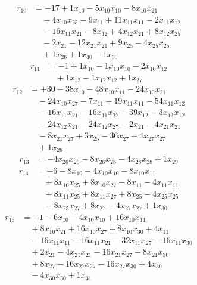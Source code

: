 \[\begin{aligned}
r_{10} &= - 17 + 1 x_{10} - 5 x_{10} x_{10} - 8 x_{10} x_{21} \\
 &\quad - 4 x_{10} x_{25} - 9 x_{11} + 11 x_{11} x_{11} - 2 x_{11} x_{12} \\
 &\quad - 16 x_{11} x_{21} - 8 x_{12} + 4 x_{12} x_{21} + 8 x_{12} x_{25} \\
 &\quad - 2 x_{21} - 12 x_{21} x_{21} + 9 x_{25} - 4 x_{25} x_{25} \\
 &\quad + 1 x_{26} + 1 x_{40} - 1 x_{65}
\end{aligned}\]
\[\begin{aligned}
r_{11} &= - 1 + 1 x_{10} - 1 x_{10} x_{10} - 2 x_{10} x_{12} \\
 &\quad + 1 x_{12} - 1 x_{12} x_{12} + 1 x_{27}
\end{aligned}\]
\[\begin{aligned}
r_{12} &= + 30 - 38 x_{10} - 48 x_{10} x_{11} - 24 x_{10} x_{21} \\
 &\quad - 24 x_{10} x_{27} - 7 x_{11} - 19 x_{11} x_{11} - 54 x_{11} x_{12} \\
 &\quad - 16 x_{11} x_{21} - 16 x_{11} x_{27} - 39 x_{12} - 3 x_{12} x_{12} \\
 &\quad - 24 x_{12} x_{21} - 24 x_{12} x_{27} - 2 x_{21} - 4 x_{21} x_{21} \\
 &\quad - 8 x_{21} x_{27} + 3 x_{25} - 36 x_{27} - 4 x_{27} x_{27} \\
 &\quad + 1 x_{28}
\end{aligned}\]
\[\begin{aligned}
r_{13} &= - 4 x_{26} x_{26} - 8 x_{26} x_{28} - 4 x_{28} x_{28} + 1 x_{29}
\end{aligned}\]
\[\begin{aligned}
r_{14} &= - 6 - 8 x_{10} - 4 x_{10} x_{10} - 8 x_{10} x_{11} \\
 &\quad + 8 x_{10} x_{25} + 8 x_{10} x_{27} - 8 x_{11} - 4 x_{11} x_{11} \\
 &\quad + 8 x_{11} x_{25} + 8 x_{11} x_{27} + 8 x_{25} - 4 x_{25} x_{25} \\
 &\quad - 8 x_{25} x_{27} + 8 x_{27} - 4 x_{27} x_{27} + 1 x_{30}
\end{aligned}\]
\[\begin{aligned}
r_{15} &= + 1 - 6 x_{10} - 4 x_{10} x_{10} + 16 x_{10} x_{11} \\
 &\quad + 8 x_{10} x_{21} + 16 x_{10} x_{27} + 8 x_{10} x_{30} + 4 x_{11} \\
 &\quad - 16 x_{11} x_{11} - 16 x_{11} x_{21} - 32 x_{11} x_{27} - 16 x_{11} x_{30} \\
 &\quad + 2 x_{21} - 4 x_{21} x_{21} - 16 x_{21} x_{27} - 8 x_{21} x_{30} \\
 &\quad + 8 x_{27} - 16 x_{27} x_{27} - 16 x_{27} x_{30} + 4 x_{30} \\
 &\quad - 4 x_{30} x_{30} + 1 x_{31}
\end{aligned}\]
